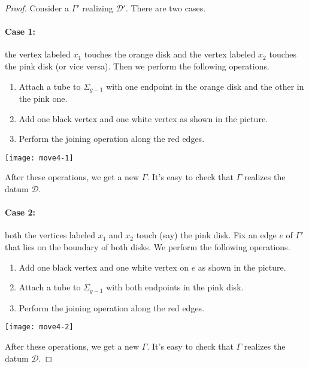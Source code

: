 \documentclass{article}
\begin{document}
\begin{proof}
Consider a \dessin{} $\Gamma'$ realizing $\mathcal{D}'$. There are two cases.
\paragraph{Case 1:} the vertex labeled $x_1$ touches the orange disk and the vertex labeled $x_2$ touches the pink disk (or vice versa). Then we perform the following operations.
\begin{enumerate}
\item Attach a tube to $\Sigma_{g-1}$ with one endpoint in the orange disk and the other in the pink one.
\item Add one black vertex and one white vertex as shown in the picture.
\item Perform the joining operation along the red edges.
\end{enumerate}
\begin{center}
\texttt{[image: move4-1]}
\end{center}
After these operations, we get a new \dessin{} $\Gamma$. It's easy to check that $\Gamma$ realizes the datum $\mathcal{D}$.
\paragraph{Case 2:} both the vertices labeled $x_1$ and $x_2$ touch (say) the pink disk. Fix an edge $e$ of $\Gamma'$ that lies on the boundary of both disks. We perform the following operations.
\begin{enumerate}
\item Add one black vertex and one white vertex on $e$ as shown in the picture.
\item Attach a tube to $\Sigma_{g-1}$ with both endpoints in the pink disk.
\item Perform the joining operation along the red edges.
\end{enumerate}
\begin{center}
\texttt{[image: move4-2]}
\end{center}
After these operations, we get a new \dessin{} $\Gamma$. It's easy to check that $\Gamma$ realizes the datum $\mathcal{D}$.
\end{proof}
\end{document}
